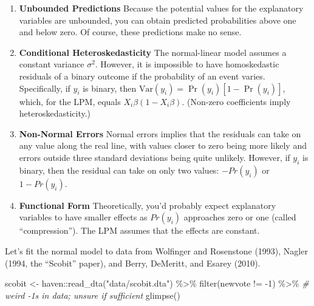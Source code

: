 \documentclass[
]{book}
\newenvironment{Shaded}{\begin{snugshade}}{\end{snugshade}}
\newcommand{\CommentTok}[1]{\textcolor[rgb]{0.56,0.35,0.01}{\textit{#1}}}
\newcommand{\DecValTok}[1]{\textcolor[rgb]{0.00,0.00,0.81}{#1}}
\newcommand{\FunctionTok}[1]{\textcolor[rgb]{0.00,0.00,0.00}{#1}}
\newcommand{\NormalTok}[1]{#1}
\newcommand{\OtherTok}[1]{\textcolor[rgb]{0.56,0.35,0.01}{#1}}
\newcommand{\SpecialCharTok}[1]{\textcolor[rgb]{0.00,0.00,0.00}{#1}}
\newcommand{\StringTok}[1]{\textcolor[rgb]{0.31,0.60,0.02}{#1}}
\providecommand{\tightlist}{%
  \setlength{\itemsep}{0pt}\setlength{\parskip}{0pt}}
\begin{document}
\begin{enumerate}
\def\labelenumi{\arabic{enumi}.}
\tightlist
\item
  \textbf{Unbounded Predictions} Because the potential values for the
  explanatory variables are unbounded, you can obtain predicted
  probabilities above one and below zero. Of course, these predictions
  make no sense.
\item
  \textbf{Conditional Heteroskedasticity} The normal-linear model
  assumes a constant variance \(\sigma^2\). However, it is impossible to
  have homoskedastic residuals of a binary outcome if the probability of
  an event varies. Specifically, if \(y_i\) is binary, then
  \(\text{Var}(y_i) = \Pr(y_i)[1 - \Pr(y_i)]\), which, for the LPM,
  equals \(X_i\beta(1 - X_i\beta)\). (Non-zero coefficients imply
  heteroskedasticity.)
\item
  \textbf{Non-Normal Errors} Normal errors implies that the residuals
  can take on any value along the real line, with values closer to zero
  being more likely and errors outside three standard deviations being
  quite unlikely. However, if \(y_i\) is binary, then the residual can
  take on only two values: \(-Pr(y_i)\) or \(1 - Pr(y_i)\).
\item
  \textbf{Functional Form} Theoretically, you'd probably expect
  explanatory variables to have smaller effects as \(Pr(y_i)\)
  approaches zero or one (called ``compression''). The LPM assumes that
  the effects are constant.
\end{enumerate}

Let's fit the normal model to data from Wolfinger and Rosenstone (1993),
Nagler (1994, the ``Scobit'' paper), and Berry, DeMeritt, and Esarey
(2010).

\begin{Shaded}
\begin{Highlighting}[]
\NormalTok{scobit }\OtherTok{\textless{}{-}}\NormalTok{ haven}\SpecialCharTok{::}\FunctionTok{read\_dta}\NormalTok{(}\StringTok{"data/scobit.dta"}\NormalTok{) }\SpecialCharTok{\%\textgreater{}\%}
  \FunctionTok{filter}\NormalTok{(newvote }\SpecialCharTok{!=} \SpecialCharTok{{-}}\DecValTok{1}\NormalTok{) }\SpecialCharTok{\%\textgreater{}\%}  \CommentTok{\# weird {-}1s in data; unsure if sufficient}
  \FunctionTok{glimpse}\NormalTok{()}
\end{Highlighting}
\end{Shaded}
\end{document}
